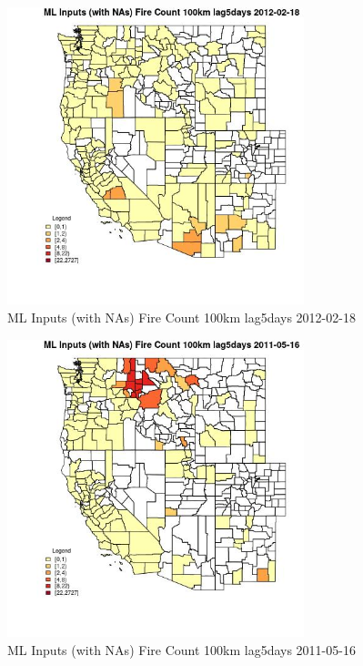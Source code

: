 \begin{figure} 
\centering  
\includegraphics[width=0.77\textwidth]{Code_Outputs/Report_ML_input_PM25_Step4_part_f_de_duplicated_aveswNAs_CountyFire_Count_100km_lag5daysMean2012-02-18.jpg} 
\caption{\label{fig:Report_ML_input_PM25_Step4_part_f_de_duplicated_aveswNAsCountyFire_Count_100km_lag5daysMean2012-02-18}ML Inputs (with NAs) Fire Count 100km lag5days 2012-02-18} 
\end{figure} 
 

\begin{figure} 
\centering  
\includegraphics[width=0.77\textwidth]{Code_Outputs/Report_ML_input_PM25_Step4_part_f_de_duplicated_aveswNAs_CountyFire_Count_100km_lag5daysMean2011-05-16.jpg} 
\caption{\label{fig:Report_ML_input_PM25_Step4_part_f_de_duplicated_aveswNAsCountyFire_Count_100km_lag5daysMean2011-05-16}ML Inputs (with NAs) Fire Count 100km lag5days 2011-05-16} 
\end{figure} 
 

